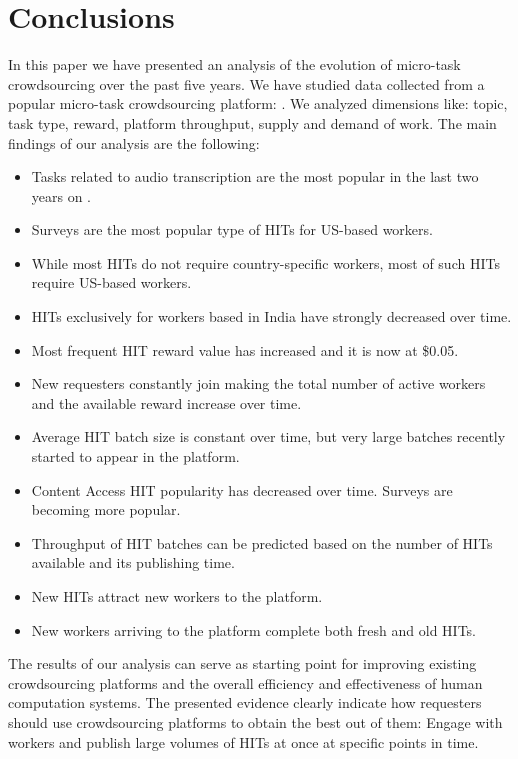 \section{Conclusions}\label{sec:conc}

In this paper we have presented an analysis of the evolution of micro-task crowdsourcing over the past five years.
We have studied data collected from a popular micro-task crowdsourcing platform: \amt{}.
We analyzed dimensions like: topic, task type, reward, platform throughput, supply and demand of work.
The main findings of our analysis are the following:
\begin{itemize}[noitemsep,topsep=0pt,parsep=0pt,partopsep=0pt]
	\item Tasks related to audio transcription are the most popular in the last two years on \amt{}.
	\item Surveys are the most popular type of HITs for US-based workers.
	\item While most HITs do not require country-specific workers, most of such HITs require US-based workers.
	\item HITs exclusively for workers based in India have strongly decreased over time.
	\item Most frequent HIT reward value has increased and it is now at \$0.05.
	\item New requesters constantly join \amt{} making the total number of active workers and the available reward increase over time.
	\item Average HIT batch size is constant over time, but very large batches recently started to appear in the platform.
	\item Content Access HIT popularity has decreased over time. Surveys are becoming more popular.
	\item Throughput of HIT batches can be predicted based on the number of HITs available   and its publishing time.
	\item New HITs attract new workers to the platform.
	\item New workers arriving to the platform complete both fresh and old HITs.
\end{itemize}

The results of our analysis can serve as starting point for improving existing crowdsourcing platforms and the overall efficiency and effectiveness of human computation systems. The presented evidence clearly indicate how requesters should use crowdsourcing platforms to obtain the best out of them: Engage with workers and publish large volumes of HITs at once at specific points in time. 

